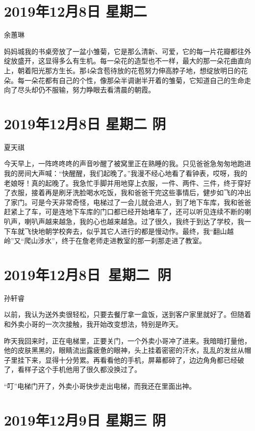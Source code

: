\section{2019年12月8日 星期二}

余蕙琳

妈妈城我的书桌旁放了一盆小雏菊，它是那么清新、可爱，它的每一片花瓣都往外绽放盛开，这显得多么有生机。每一朵花的造型也不一样，最大的那一朵花曲直向上，朝着阳光那方生长。那4朵含苞待放的花苞努力伸高脖子地，想绽放明日的花朵。每一朵花都有自己的个性，像那朵半调谢半开着的雏菊，它知道自己的生命走向了尽头却仍不服输，努力睁眼去看清晨的朝霞。

\section{2019年12月8日 星期二 阴}

夏天祺

今天早上，一阵咚咚咚的声音吵醒了被窝里正在熟睡的我。只见爸爸急匆匆地跑进我的房间大声喊：``快醒醒，我们起晚了。''我漫不经心地看了看钟表，哎呀，我的老娘呀！真的起晚了。我急忙手脚并用地穿上衣服，一件、两件、三件，终于穿好了衣服，接着再是刷牙洗脸喝水吃饭，我和爸爸干完这些事情后，健步如飞的冲出了家门。可是今天非常奇怪，电梯过了一会儿就会进人，到了地下车库，我和爸爸赶紧上了车，可是连地下车库的门口都已经开始堵车了，还可以听见连续不断的喇叭声，喇叭声越来越急，我的心也越来越急。过了很久，我终于到达了学校，我一下车就飞快地朝学校奔去，似乎其它人进行的都是慢动作。最终，我``翻山越岭''又``爬山涉水''，终于在詹老师走进教室的那一刹那走进了教室。

\section{2019年12月8日~星期二~阴}

孙轩睿

以前，我认为送外卖很轻松，只要去餐厅拿一盒饭，送到客户家里就好了。但随着和外卖小哥的一次次接触，我开始改变想法，特别是昨天。

昨天我回来时，正在电梯里，正要关门，一个外卖小哥冲了进来。我暗暗打量他，他的皮肤黑黑的，眼睛流出露疲惫的眼神，头上挂着密密的汗水，乱乱的发丝从帽子里挂下来，显得十分劳累。再看看他的手机，屏幕都碎了，边边角角都已经破了，看样子这个手机他用了很久都没换过了。

``叮''电梯门开了，外卖小哥快步走出电梯，而我还在里面出神。

\section{2019年12月9日 星期三 阴}

